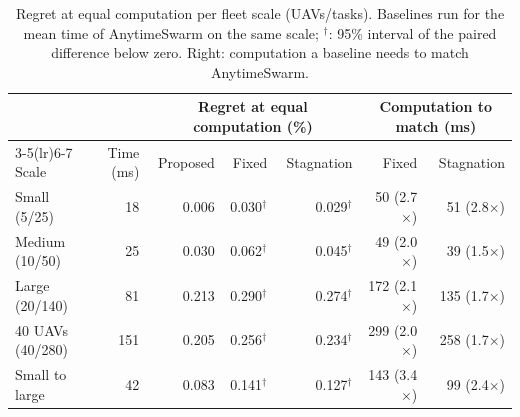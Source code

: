 \begin{table}[t]
\caption{Regret at equal computation per fleet scale (UAVs/tasks). Baselines run for the mean time of AnytimeSwarm on the same scale; $^{\dagger}$: 95\% interval of the paired difference below zero. Right: computation a baseline needs to match AnytimeSwarm.}
\label{tab:scale}
\centering
\setlength{\tabcolsep}{3pt}
\begin{tabular}{lrrrrrr}
\toprule
 & & \multicolumn{3}{c}{Regret at equal computation (\%)} & \multicolumn{2}{c}{Computation to match (ms)} \\
\cmidrule(lr){3-5}\cmidrule(lr){6-7}
Scale & Time (ms) & Proposed & Fixed & Stagnation & Fixed & Stagnation \\
\midrule
Small (5/25) & 18 & 0.006 & 0.030$^{\dagger}$ & 0.029$^{\dagger}$ & 50 (2.7$\times$) & 51 (2.8$\times$) \\
Medium (10/50) & 25 & 0.030 & 0.062$^{\dagger}$ & 0.045$^{\dagger}$ & 49 (2.0$\times$) & 39 (1.5$\times$) \\
Large (20/140) & 81 & 0.213 & 0.290$^{\dagger}$ & 0.274$^{\dagger}$ & 172 (2.1$\times$) & 135 (1.7$\times$) \\
40 UAVs (40/280) & 151 & 0.205 & 0.256$^{\dagger}$ & 0.234$^{\dagger}$ & 299 (2.0$\times$) & 258 (1.7$\times$) \\
\midrule
Small to large & 42 & 0.083 & 0.141$^{\dagger}$ & 0.127$^{\dagger}$ & 143 (3.4$\times$) & 99 (2.4$\times$) \\
\bottomrule
\end{tabular}
\end{table}
